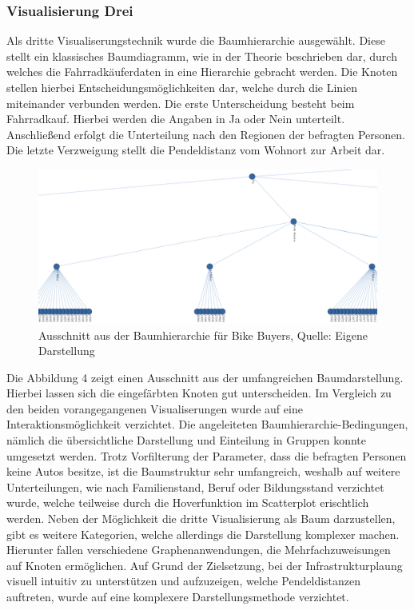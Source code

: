 \documentclass[usegeometry=true]{scrartcl}
\begin{document}
\subsubsection{Visualisierung Drei}
Als dritte Visualiserungstechnik wurde die Baumhierarchie ausgewählt. Diese stellt ein klassisches Baumdiagramm, wie in der Theorie beschrieben dar, durch welches die Fahrradkäuferdaten in eine Hierarchie gebracht werden. Die Knoten stellen hierbei Entscheidungsmöglichkeiten dar, welche durch die Linien miteinander verbunden werden. Die erste Unterscheidung besteht beim Fahrradkauf. Hierbei werden die Angaben in Ja oder Nein unterteilt. Anschließend erfolgt die Unterteilung nach den Regionen der befragten Personen. Die letzte Verzweigung stellt die Pendeldistanz vom Wohnort zur Arbeit dar. 
\begin{figure}[h]
\begin{center}
\includegraphics[width=12cm]{Bilder/V3Baumhierarchie.png}
\caption{Ausschnitt aus der Baumhierarchie für Bike Buyers, Quelle: Eigene Darstellung}
\end{center}
\end{figure}
\newpage
Die Abbildung 4 zeigt einen Ausschnitt aus der umfangreichen Baumdarstellung. Hierbei lassen sich die eingefärbten Knoten gut unterscheiden. Im Vergleich zu den beiden vorangegangenen Visualiserungen wurde auf eine Interaktionsmöglichkeit verzichtet. Die angeleiteten Baumhierarchie-Bedingungen, nämlich die übersichtliche Darstellung und Einteilung in Gruppen konnte umgesetzt werden. Trotz Vorfilterung der Parameter, dass die befragten Personen keine Autos besitze, ist die Baumstruktur sehr umfangreich, weshalb auf weitere Unterteilungen, wie nach Familienstand, Beruf oder Bildungsstand verzichtet wurde, welche teilweise durch die Hoverfunktion im Scatterplot erischtlich werden. Neben der Möglichkeit die dritte Visualisierung als Baum darzustellen, gibt es weitere Kategorien, welche allerdings die Darstellung komplexer machen. Hierunter fallen verschiedene Graphenanwendungen, die Mehrfachzuweisungen auf Knoten ermöglichen. Auf Grund der Zielsetzung, bei der Infrastrukturplaung visuell intuitiv zu unterstützen und  aufzuzeigen, welche Pendeldistanzen auftreten, wurde auf eine komplexere Darstellungsmethode verzichtet. 
\end{document}
